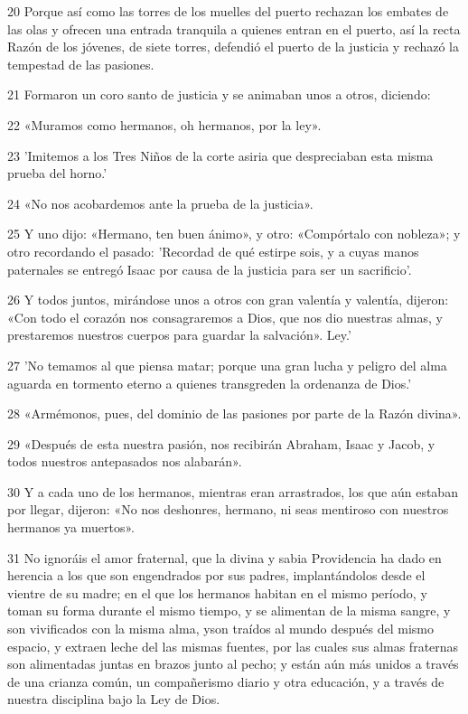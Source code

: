 \par 20 Porque así como las torres de los muelles del puerto rechazan los embates de las olas y ofrecen una entrada tranquila a quienes entran en el puerto, así la recta Razón de los jóvenes, de siete torres, defendió el puerto de la justicia y rechazó la tempestad de las pasiones.

\par 21 Formaron un coro santo de justicia y se animaban unos a otros, diciendo:

\par 22 «Muramos como hermanos, oh hermanos, por la ley».

\par 23 'Imitemos a los Tres Niños de la corte asiria que despreciaban esta misma prueba del horno.'

\par 24 «No nos acobardemos ante la prueba de la justicia».

\par 25 Y uno dijo: «Hermano, ten buen ánimo», y otro: «Compórtalo con nobleza»; y otro recordando el pasado: 'Recordad de qué estirpe sois, y a cuyas manos paternales se entregó Isaac por causa de la justicia para ser un sacrificio'.

\par 26 Y todos juntos, mirándose unos a otros con gran valentía y valentía, dijeron: «Con todo el corazón nos consagraremos a Dios, que nos dio nuestras almas, y prestaremos nuestros cuerpos para guardar la salvación». Ley.'

\par 27 'No temamos al que piensa matar; porque una gran lucha y peligro del alma aguarda en tormento eterno a quienes transgreden la ordenanza de Dios.'

\par 28 «Armémonos, pues, del dominio de las pasiones por parte de la Razón divina».

\par 29 «Después de esta nuestra pasión, nos recibirán Abraham, Isaac y Jacob, y todos nuestros antepasados ​​nos alabarán».

\par 30 Y a cada uno de los hermanos, mientras eran arrastrados, los que aún estaban por llegar, dijeron: «No nos deshonres, hermano, ni seas mentiroso con nuestros hermanos ya muertos».

\par 31 No ignoráis el amor fraternal, que la divina y sabia Providencia ha dado en herencia a los que son engendrados por sus padres, implantándolos desde el vientre de su madre; en el que los hermanos habitan en el mismo período, y toman su forma durante el mismo tiempo, y se alimentan de la misma sangre, y son vivificados con la misma alma, y ​​son traídos al mundo después del mismo espacio, y extraen leche del las mismas fuentes, por las cuales sus almas fraternas son alimentadas juntas en brazos junto al pecho; y están aún más unidos a través de una crianza común, un compañerismo diario y otra educación, y a través de nuestra disciplina bajo la Ley de Dios.

